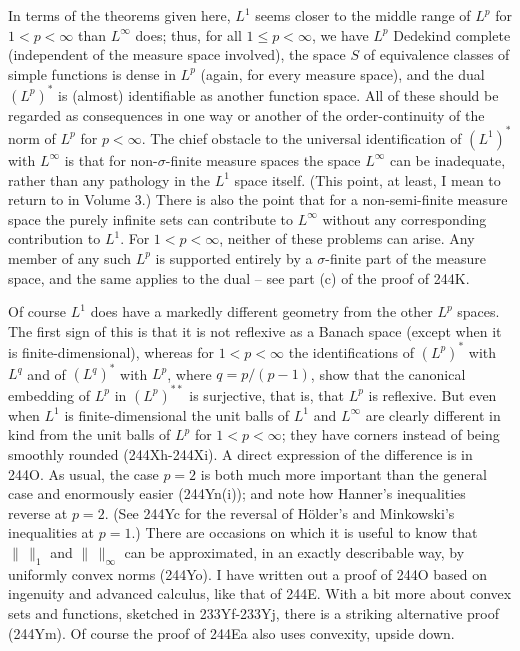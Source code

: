 {In terms of the theorems given here, $L^1$ seems closer to the middle
range of $L^p$ for $1<p<\infty$ than $L^{\infty}$ does;  thus, for all
$1\le p<\infty$, we have $L^p$ Dedekind complete (independent of the
measure space involved), the space $S$ of equivalence classes of simple
functions is dense in $L^p$ (again, for every measure space), and the
dual $(L^p)^*$ is (almost) identifiable as another function space.   All
of these should be regarded as consequences in one way or another of the
order-continuity of the norm of $L^p$ for $p<\infty$.   The chief
obstacle to the universal identification of $(L^1)^*$ with $L^{\infty}$
is that for non-$\sigma$-finite measure spaces the space $L^{\infty}$
can be inadequate, rather than any pathology in the $L^1$ space itself.
(This point, at least, I mean to return to in Volume 3.)
There is also the point that for a non-semi-finite measure space the
purely infinite sets can contribute to $L^{\infty}$ without any
corresponding contribution to $L^1$.   For $1<p<\infty$, neither of these
problems can arise.   Any member of any such $L^p$ is supported entirely
by a $\sigma$-finite part of the measure space, and the same applies to
the dual -- see part (c) of the proof of 244K.

Of course $L^1$ does have a markedly different geometry from the other
$L^p$ spaces.   The first sign of this is that it is not reflexive as a
Banach space (except when it is finite-dimensional), whereas for
$1<p<\infty$ the identifications of $(L^p)^*$ with $L^q$ and of $(L^q)^*$
with $L^p$, where $q=p/(p-1)$, show that the canonical embedding of $L^p$
in $(L^p)^{**}$ is surjective, that is, that $L^p$ is reflexive.   But
even when $L^1$ is
finite-dimensional the unit balls of $L^1$ and $L^{\infty}$ are clearly
different in kind from the unit balls of $L^p$ for $1<p<\infty$;   they
have corners instead of being smoothly rounded (244Xh-244Xi).
A direct expression of the
difference is in 244O.   As usual, the case $p=2$ is both much more
important than the general case and enormously easier (244Yn(i));  and note
how Hanner's inequalities reverse at $p=2$.   (See 244Yc for the reversal
of H\"older's and Minkowski's inequalities at $p=1$.)   There are
occasions on which it is useful to know that $\|\,\|_1$ and
$\|\,\|_{\infty}$ can be approximated, in an exactly describable way,
by uniformly convex norms (244Yo).   I have written out a proof of 244O
based on ingenuity and advanced calculus, like that of 244E.
With a bit more about convex sets and functions, sketched in
233Yf-233Yj, %
there is a striking alternative proof (244Ym).   Of course the proof of
244Ea also uses convexity, upside down.

}
